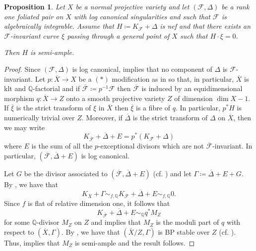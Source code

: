\documentclass[12pt]{amsart}
\newtheorem{proposition}[theorem]{Proposition}
\newcommand{\cal}[1]{\mathcal{#1}}
\begin{document}
\begin{proposition}
\label{p_semi_ample_fibr}
Let $X$ be a  normal projective variety 
and let $(\cal F,\Delta)$ be a rank one  foliated  pair on $X$ with log canonical singularities and such that 
$\cal F$ is algebraically integrable. 
 Assume that   $H\coloneq K_{\cal F}+\Delta$ is nef and that there exists an $\cal F$-invariant curve 
$\xi$  passing through a general point of $X$  such that $H\cdot \xi=0$. 

Then $H$ is semi-ample.
\end{proposition}
\begin{proof}
Since $(\cal F,\Delta)$ is log canonical, \cite[Lemma 2.5]{CS23b} implies that no component of $\Delta$ is $\cal F$-invariant. 
Let $p\colon \overline{X}\to X$ be a $(*)$ modification as in \cite[Theorem 3.10]{ACSS} so that, in particular,  $\overline{X}$ is klt and $\mathbb Q$-factorial and if $\overline{\cal F} \coloneqq p^{-1}\cal F$  then 
$\overline{\cal F}$  is induced by an equidimensional morphism $q\colon \overline{X}\to Z$ onto a smooth projective variety $Z$ of dimension $\dim X-1$. 
If $\overline \xi$ is the strict transform of $\xi$ in $\overline X$ then $\overline \xi$ is a fibre of $q$.
 In particular, 
 $p^*H$ is numerically trivial over $Z$. 
Moreover, 
if $\overline {\Delta}$ is the strict transform of $\Delta$ on $\overline X$, then we may  write 
\[
K_{\overline {\cal F}}+\overline\Delta +E = p^*(K_{\cal F}+\Delta)
\]
where $E$ is the  sum of all the $p$-exceptional divisors which are not $\overline{\cal F}$-invariant. 
In particular, $(\overline{\cal F},\overline\Delta+E)$ is log canonical. 

Let $G$ be the divisor associated to $(\overline{\cal F},\overline\Delta+E)$ (cf. \cite[Definition 3.5]{ACSS}) and let $\Gamma\coloneq \overline\Delta+E+G$. 
By \cite[Proposition 3.6]{ACSS}, we have that
\[
K_{\overline X}+\Gamma\sim_{f,\mathbb Q}
K_{\overline{\cal F}}+\overline\Delta+E \sim_{f,\mathbb Q} 0.
\]
Since $f$ is flat of relative dimension one, it follows that 
\[
K_{\overline {\cal F}}+\overline \Delta+E\sim_{\mathbb Q}q^*M_Z
\]
for some $\mathbb Q$-divisor $M_Z$ on  $Z$ and \cite[Proposition 3.6]{ACSS} implies that $M_Z$ is the moduli part of $q$ with respect to $(\overline X,\Gamma)$. 
By \cite[Theorem 4.3]{ACSS}, we have that $(\overline X/Z,\Gamma)$ is BP stable over $Z$ (cf. \cite[Definition 2.5]{ACSS}). 
Thus, \cite[Theorem 8.1]{PS09} implies that $M_{Z}$ is semi-ample and the result follows. 
\end{proof}
\end{document}
